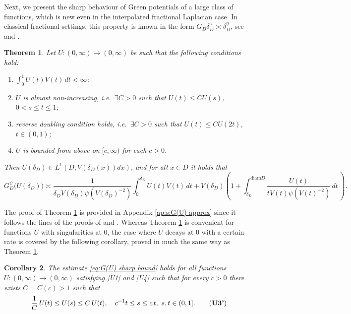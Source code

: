 \documentclass[12pt,a4paper,onecolumn]{article}
\newtheorem{thm}{Theorem}[section]
\newtheorem{cor}[thm]{Corollary}
\theoremstyle{definition}
\newcommand{\1}{\mathbf 1}
\newcommand{\de}{\delta_D}
\newcommand{\LLL}{L^1(D,V(\de(x))dx)}
\newcommand{\GDP}{G_D^\psi}
\newcommand{\diam}{\textrm{diam}}
\numberwithin{equation}{section}
\begin{document}
   Next, we present the sharp behaviour of Green potentials of a large class of functions, which is new even in the interpolated fractional Laplacian case. In classical fractional settings, this property is known in the form $G_D \de^\gamma\asymp \de^{\eta}$, see \cite{dhifli2012} and \cite[Theorem 3.4]{AGCV19}.

 \begin{thm}\label{t:bndry-G(U)}
		Let $U:(0,\infty)\to(0,\infty)$ be such that the following conditions hold:
		\begin{enumerate}[label=(\textbf{U\arabic*})]
			\item \label{U1}  
			$\int_{0}^1U(t)V(t)\, dt <\infty$;
			
			\item \label{U2} $U$ is almost non-increasing, i.e.~$\exists C>0$ such that $U(t)\le C U(s)$, $0<s\le t\le 1$;
			
			
			\item \label{U3} reverse doubling condition holds, i.e.~$\exists C>0$  
			such that $U(t)\le C U(2t)$, $t\in (0,1)$; 
			\item \label{U4} $U$ is bounded from
			above on $[c, \infty)$ for each $c >0$.
		\end{enumerate}
		Then $U(\de)\in\LLL$, and for all $x\in D$ it holds that
		\begin{equation}\label{eq:G(U) sharp bound}
    			\GDP\big(U(\de)\big)\asymp
    			\frac{1}{\de V(\de)\psi(V(\de)^{-2})}\int_0^{\de}U(t)V(t)\, dt+
    			V(\de)\left(1+\int_{\de}^{\diam D}
    			\frac{U(t)}{t V(t)\psi(V(t)^{-2})}\, dt\,\right).  
		\end{equation}
	\end{thm}
    The proof of Theorem \ref{t:bndry-G(U)} is provided in Appendix \ref{ap:s:G(U) approx} since it follows the lines of the proofs of \cite[Theorem 3.6]{Bio23cpaa} and \cite[Proposition 4.1]{BVW-na21}. 
    Whereas Theorem \ref{t:bndry-G(U)} is convenient for functions $U$ with singularities at 0, the case where $U$ decays at $0$ with a certain rate is covered by the following corollary, proved in much the same way as Theorem \ref{t:bndry-G(U)}.
    \begin{cor}\label{c:bndry-G(U)-decay}
     The estimate \eqref{eq:G(U) sharp bound} holds for all functions $U:(0,\infty)\to(0,\infty)$ satisfying \ref{U1} and \ref{U4} such that for every $c>0$ there exists $C=C(c)>1$ such that 
        \begin{align}\label{eq: U3'}
            \frac{1}{C}\, U(t)\le U(s)\le C\, U(t),\quad   {c}^{-1} t \le s \le c\,t, \ s,t\in (0,1].  \tag{\textbf{U3'}}
        \end{align}
    \end{cor}
 
\end{document}
